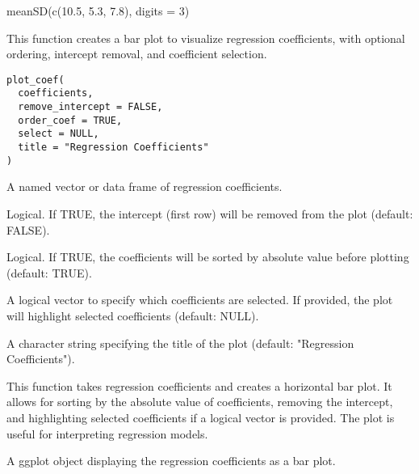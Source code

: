 \documentclass[a4paper]{book}
\begin{document}
%
\begin{Examples}
\begin{ExampleCode}
meanSD(c(10.5, 5.3, 7.8), digits = 3)
\end{ExampleCode}
\end{Examples}
%
\begin{Description}
This function creates a bar plot to visualize regression coefficients, with optional ordering, intercept removal, and coefficient selection.
\end{Description}
%
\begin{Usage}
\begin{verbatim}
plot_coef(
  coefficients,
  remove_intercept = FALSE,
  order_coef = TRUE,
  select = NULL,
  title = "Regression Coefficients"
)
\end{verbatim}
\end{Usage}
%
\begin{Arguments}
\begin{ldescription}
\item[\code{coefficients}] A named vector or data frame of regression coefficients.

\item[\code{remove\_intercept}] Logical. If TRUE, the intercept (first row) will be removed from the plot (default: FALSE).

\item[\code{order\_coef}] Logical. If TRUE, the coefficients will be sorted by absolute value before plotting (default: TRUE).

\item[\code{select}] A logical vector to specify which coefficients are selected. If provided, the plot will highlight selected coefficients (default: NULL).

\item[\code{title}] A character string specifying the title of the plot (default: "Regression Coefficients").
\end{ldescription}
\end{Arguments}
%
\begin{Details}
This function takes regression coefficients and creates a horizontal bar plot. It allows for sorting by the absolute value of coefficients, removing the intercept, and highlighting selected coefficients if a logical vector is provided. The plot is useful for interpreting regression models.
\end{Details}
%
\begin{Value}
A ggplot object displaying the regression coefficients as a bar plot.
\end{Value}
\end{document}
